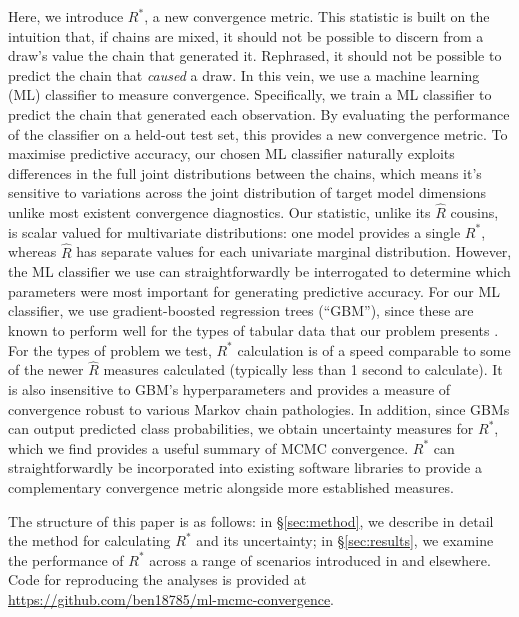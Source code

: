 \documentclass{article}
\begin{document}
Here, we introduce $R^*$, a new convergence metric. This statistic is built on the intuition that, if chains are mixed, it should not be possible to discern from a draw's value the chain that generated it. Rephrased, it should not be possible to predict the chain that \textit{caused} a draw. In this vein, we use a machine learning (ML) classifier to measure convergence. Specifically, we train a ML classifier to predict the chain that generated each observation. By evaluating the performance of the classifier on a held-out test set, this provides a new convergence metric. To maximise predictive accuracy, our chosen ML classifier naturally exploits differences in the full joint distributions between the chains, which means it's sensitive to variations across the joint distribution of target model dimensions unlike most existent convergence diagnostics. Our statistic, unlike its $\widehat{R}$ cousins, is scalar valued for multivariate distributions: one model provides a single $R^*$, whereas $\widehat{R}$ has separate values for each univariate marginal distribution. However, the ML classifier we use can straightforwardly be interrogated to determine which parameters were most important for generating predictive accuracy. For our ML classifier, we use gradient-boosted regression trees \citep{friedman2001greedy,greenwell2019package} (``GBM''), since these are known to perform well for the types of tabular data that our problem presents \citep{chollet2018}. For the types of problem we test, $R^*$ calculation is of a speed comparable to some of the newer $\widehat{R}$ measures calculated (typically less than 1 second to calculate). It is also insensitive to GBM's hyperparameters and provides a measure of convergence robust to various Markov chain pathologies. In addition, since GBMs can output predicted class probabilities, we obtain uncertainty measures for $R^*$, which we find provides a useful summary of MCMC convergence. $R^*$ can straightforwardly be incorporated into existing software libraries to provide a complementary convergence metric alongside more established measures.

The structure of this paper is as follows: in \S\ref{sec:method}, we describe in detail the method for calculating $R^*$ and its uncertainty; in \S\ref{sec:results}, we examine the performance of $R^*$ across a range of scenarios introduced in \citep{vehtari2019rank} and elsewhere. Code for reproducing the analyses is provided at \url{https://github.com/ben18785/ml-mcmc-convergence}.
\end{document}
